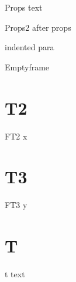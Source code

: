 \documentclass[presentation]{beamer}
\begin{document}
\begin{frame}[label={sec:org29be008}]{Props}
text
\end{frame}
\begin{frame}[label={sec:org4d0f8dc}]{Props2}
after props

indented para
\end{frame}

\begin{frame}[label={sec:org9732262}]{Emptyframe}
\end{frame}

\section{T2}
\label{sec:orge218a84}

\begin{frame}[label={sec:orgd162303}]{FT2}
x
\end{frame}
\section{T3}
\label{sec:org30c18d4}
\begin{frame}[label={sec:org2211310}]{FT3}
y
\end{frame}
\section{T}
\label{sec:orgb5e801c}

t text
\end{document}
